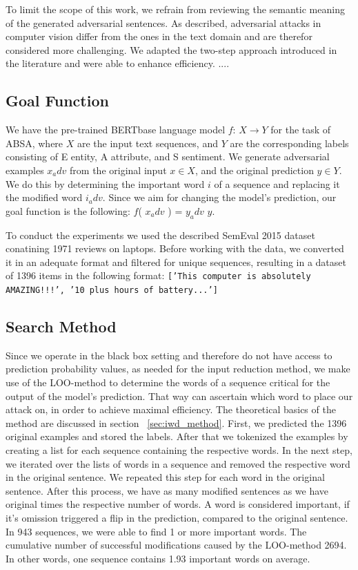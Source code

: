 To limit the scope of this work, we refrain from reviewing the semantic meaning of the generated adversarial sentences.
As described, adversarial attacks in computer vision differ from the ones in the text domain and are therefor considered more challenging. We adapted the two-step approach introduced in the literature and were able to enhance efficiency. 
....

\subsection{Goal Function}
 \label{sec:goal_function_m}
We have the pre-trained BERTbase language model $f$: ${X \rightarrow Y}$ for the task of ABSA, where $X$ are the input text sequences, and $Y$ are the corresponding labels consisting of E entity, A attribute, and S sentiment. We generate adversarial examples ${x_adv}$ from the original input $x \in X$, and the original prediction $y \in Y$. We do this by determining the important word $i$ of a sequence and replacing it the modified word $i_adv$. Since we aim for changing the model's prediction, our goal function is the following: 
$f$( $x_adv$ ) = $y_adv$ \neq $y$.


To conduct the experiments we used the described SemEval 2015 dataset conatining 1971 reviews on laptops. Before working with the data, we converted it in an adequate format and filtered for unique sequences, resulting in a dataset of 1396 items in the following format:
\texttt{['This computer is absolutely AMAZING!!!', '10 plus hours of battery...']}


\subsection{Search Method}
\label{sec:search_method_m}
Since we operate in the black box setting and therefore do not have access to prediction probability values, as needed for the input reduction method, we make use of the LOO-method to determine the words of a sequence critical for the output of the model's prediction. That way can ascertain which word to place our attack on, in order to achieve maximal efficiency. The theoretical basics of the method are discussed in section ~\ref{sec:iwd_method}.
First, we predicted the 1396 original examples and stored the labels. After that we tokenized the examples by creating a list for each sequence containing the respective words. In the next step, we iterated over the lists of words in a sequence and removed the respective word in the original sentence. We repeated this step for each word in the original sentence. 
After this process, we have as many modified sentences as we have original times the respective number of words. A word is considered important, if it's omission triggered a flip in the prediction, compared to the original sentence. 
In 943 sequences, we were able to find 1 or more important words. The cumulative number of successful modifications caused by the LOO-method 2694. In other words, one sequence contains 1.93 important words on average.

